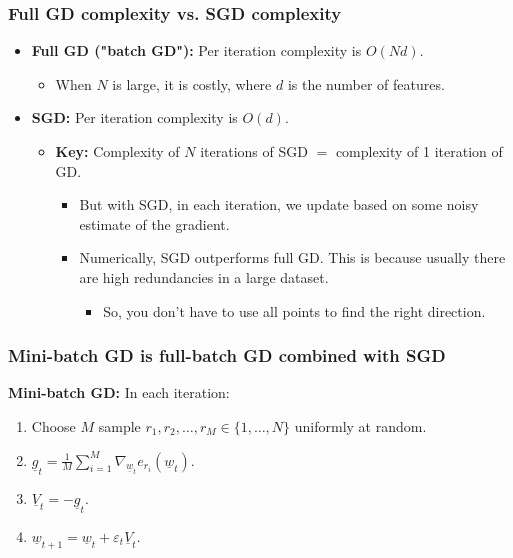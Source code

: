     \subsubsection{Full GD complexity vs. SGD complexity}
    \begin{intuition}
        \begin{itemize}
            \item \textbf{Full GD ("batch GD"):} Per iteration complexity is \( O(Nd) \).
            \begin{itemize}[left=0pt]
                \item When \( N \) is large, it is costly, where $d$ is the number of features.
            \end{itemize}
    
            \item \textbf{SGD:} Per iteration complexity is \( O(d) \).
            \begin{itemize}[left=0pt]
                \item \textbf{Key:} Complexity of \( N \) iterations of SGD \( = \) complexity of 1 iteration of GD.
                \begin{itemize}
                    \item But with SGD, in each iteration, we update based on some noisy estimate of the gradient.
                    \item Numerically, SGD outperforms full GD. This is because usually there are high redundancies in a large dataset.
                    \begin{itemize}
                        \item So, you don't have to use all points to find the right direction.
                    \end{itemize}
                \end{itemize} 
            \end{itemize}
        \end{itemize}
    \end{intuition}

    \subsubsection{Mini-batch GD is full-batch GD combined with SGD}
    \begin{definition}
        \textbf{Mini-batch GD:} In each iteration:
        \begin{enumerate}[left=0pt]
            \item Choose \( M \) sample \( r_1, r_2, \dots, r_M \in \{1, \dots, N\} \) uniformly at random.
            \item \( \underline{g}_t = \frac{1}{M} \sum_{i=1}^{M} \nabla_{\underline{w}_t} e_{r_i}(\underline{w}_t) \).
            \item \( \underline{V}_t = -\underline{g}_t \).
            \item \( \underline{w}_{t+1} = \underline{w}_t + \varepsilon_t \underline{V}_t \).
        \end{enumerate}
    \end{definition}

